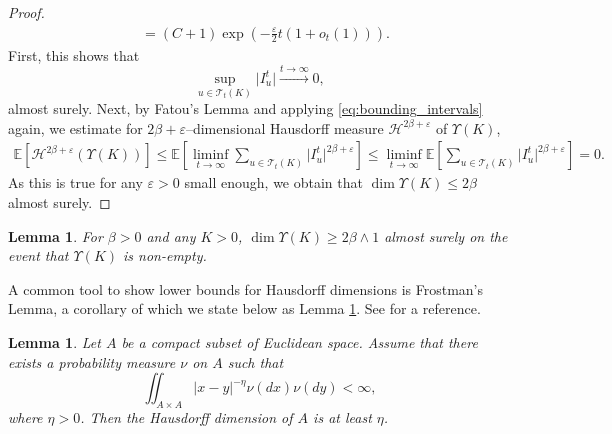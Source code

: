 \documentclass{article}
\newtheorem{lem}[thm]{Lemma}
\theoremstyle{definition}
\numberwithin{equation}{section}
\numberwithin{thm}{section}
\newcommand*{\eps}{\ensuremath{\varepsilon}}            %
\newcommand*{\EE}{\ensuremath{\mathbb{E}}}	        	%
\begin{document}
\begin{proof}
\begin{align}
        &= (C+1) \exp\left(- \frac{\eps}{2}t(1+o_t(1))\right).
        \label{eq:bounding_intervals}
    \end{align}
    First, this shows that 
    \begin{equation*}
        \sup_{u \in \mathcal{T}_t(K)} \vert I_u^t\vert \xrightarrow{t\to \infty} 0,
    \end{equation*}
    almost surely. 
    Next, by Fatou's Lemma and applying \eqref{eq:bounding_intervals} again, {we estimate for $2\beta+\eps$--dimensional Hausdorff measure $\mathcal{H}^{2\beta+\eps}$ of $\Upsilon(K)$},
    \begin{align*}
        \EE\left[\mathcal{H}^{2\beta+\eps}(\Upsilon(K))\right] \leq \EE\left[\liminf_{t \to \infty}\sum_{u\in \mathcal{T}_t(K)}\vert I_u^t\vert^{2\beta + \eps}\right] \leq \liminf_{t \to \infty} \EE\left[\sum_{u\in \mathcal{T}_t(K)}\vert I_u^t\vert^{2\beta + \eps}\right]=0.
    \end{align*}
    As this is true for any $\eps>0$ small enough, we obtain that $\dim \Upsilon(K) \leq 2\beta$ almost surely.
\end{proof}

\begin{lem}\label{lemma:lower_bound_simplified}
    For $\beta>0$ and any $K>0$, $\dim \Upsilon(K) \geq 2\beta \wedge 1$ almost surely on the event that $\Upsilon(K)$ is non-empty.
\end{lem}

A common tool to show lower bounds for Hausdorff dimensions is Frostman's Lemma, {a corollary of which we state below as Lemma \ref{lemma:frostman}}. See \cite[Theorem 4.13]{falconer_fractal_2014} for a reference. 

\begin{lem}\label{lemma:frostman}
    Let $A$ be a compact subset of Euclidean space. Assume that there exists a probability measure $\nu$ on $A$ such that
    \begin{equation*}
        \iint_{A\times A} \vert x-y\vert^{-\eta} \nu(dx)\nu(dy) < \infty,
    \end{equation*}
    where $\eta >0$. Then the Hausdorff dimension of $A$ is at least $\eta$.
\end{lem}
\end{document}
